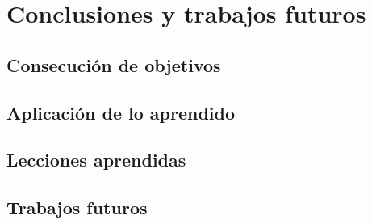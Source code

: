 \chapter{Conclusiones y trabajos futuros}
\label{chap:conclusiones}


\section{Consecución de objetivos}
\label{sec:consecucion-objetivos}


\section{Aplicación de lo aprendido}
\label{sec:aplicacion}


\section{Lecciones aprendidas}
\label{sec:lecciones_aprendidas}


\section{Trabajos futuros}
\label{sec:trabajos_futuros}

